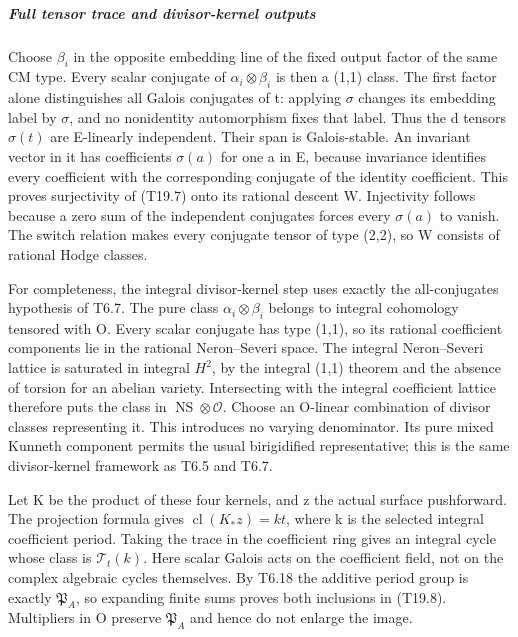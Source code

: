 \documentclass[11pt,a4paper]{article}
\theoremstyle{definition}
\begin{document}
\subparagraph{Full tensor trace and divisor-kernel outputs}\label{full-tensor-trace-and-divisor-kernel-outputs}

Choose \(\beta_i\) in the opposite embedding line of the fixed output factor of the same CM type. Every scalar conjugate of \(\alpha_i\otimes\beta_i\) is then a (1,1) class. The first factor alone distinguishes all Galois conjugates of t: applying \(\sigma\) changes its embedding label by \(\sigma\), and no nonidentity automorphism fixes that label. Thus the d tensors \(\sigma(t)\) are E-linearly independent. Their span is Galois-stable. An invariant vector in it has coefficients \(\sigma(a)\) for one a in E, because invariance identifies every coefficient with the corresponding conjugate of the identity coefficient. This proves surjectivity of (T19.7) onto its rational descent W. Injectivity follows because a zero sum of the independent conjugates forces every \(\sigma(a)\) to vanish. The switch relation makes every conjugate tensor of type (2,2), so W consists of rational Hodge classes.

For completeness, the integral divisor-kernel step uses exactly the all-conjugates hypothesis of T6.7. The pure class \(\alpha_i\otimes\beta_i\) belongs to integral cohomology tensored with O. Every scalar conjugate has type (1,1), so its rational coefficient components lie in the rational Neron--Severi space. The integral Neron--Severi lattice is saturated in integral \(H^2\), by the integral (1,1) theorem and the absence of torsion for an abelian variety. Intersecting with the integral coefficient lattice therefore puts the class in \(\operatorname{NS}\otimes\mathcal O\). Choose an O-linear combination of divisor classes representing it. This introduces no varying denominator. Its pure mixed Kunneth component permits the usual birigidified representative; this is the same divisor-kernel framework as T6.5 and T6.7.

Let K be the product of these four kernels, and z the actual surface pushforward. The projection formula gives \(\operatorname{cl}(K_*z)=kt\), where k is the selected integral coefficient period. Taking the trace in the coefficient ring gives an integral cycle whose class is \(\mathcal T_t(k)\). Here scalar Galois acts on the coefficient field, not on the complex algebraic cycles themselves. By T6.18 the additive period group is exactly \(\mathfrak P_A\), so expanding finite sums proves both inclusions in (T19.8). Multipliers in O preserve \(\mathfrak P_A\) and hence do not enlarge the image.
\end{document}
